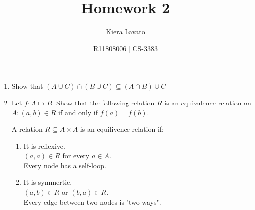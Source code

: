 \documentclass[letterpaper,11pt]{article}
\title{Homework 2}
\author{Kiera Lavato}
\date{R11808006 | CS-3383}
\begin{document}
	\maketitle
	
	\begin{enumerate}
		\item Show that $(A\cup C)\cap(B\cup C) \subseteq (A \cap B) \cup C$
		
		
		\newpage
		\item Let $f:A\mapsto B$. Show that the following relation $R$ is an equivalence relation on $A: (a,b) \in R$ if and only if $f(a)=f(b)$.
		
		A relation $R \subseteq A\times A$ is an equilivence relation if:
		\begin{enumerate}
		    \item It is reflexive.\\
		    $(a,a)\in R$ for every $a \in A$.\\
		    Every node has a self-loop.\\
		    
		    \item It is symmertic.\\
		    $(a,b)\in R$ or $(b,a)\in R$.\\
		    Every edge between two nodes is "two ways".\\
		    

\end{enumerate}
\end{enumerate}
\end{document}
